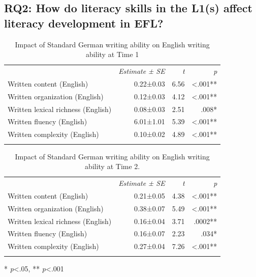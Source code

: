 \documentclass[output=paper,modfonts,nonflat,newtxmath]{langsci/langscibook}
\begin{document}
\subsection{RQ2: {How} {do} {literacy} {skills} {in} {the} {L1(s)} {affect} {literacy} {development} {in} {EFL?}}


\begin{table}
\caption{\label{tab:pfenninger:10}Impact of Standard German writing ability on English writing ability at Time 1}

\begin{tabularx}{0.86\textwidth}{lrrr}
\lsptoprule
& \textit{Estimate} \textit{±} \textit{SE} & \textit{t} & \textit{p}\\
\cmidrule{1-4}
Written content (English) & 0.22±0.03 & 6.56 & <.001**\\
Written organization (English) & 0.12±0.03 & 4.12 & <.001**\\
Written lexical richness (English) & 0.08±0.03 & 2.51 & .008*\\
Written fluency (English) & 6.01±1.01 & 5.39 & <.001**\\
Written complexity (English) & 0.10±0.02 & 4.89 & <.001**\\
\lspbottomrule
\end{tabularx}
\end{table}

\begin{table}
\caption{\label{tab:pfenninger:11}Impact of Standard German writing ability on English writing ability at Time 2.}

\begin{tabularx}{0.86\textwidth}{lrrr}
\lsptoprule
& \textit{Estimate} \textit{±} \textit{SE} & \textit{t} & \textit{p}\\
\cmidrule{1-4}
Written content (English) & 0.21±0.05 & 4.38 & <.001**\\
Written organization (English) & 0.38±0.07 & 5.49 & <.001**\\
Written lexical richness (English) & 0.16±0.04 & 3.71 & .0002**\\
Written fluency (English) & 0.16±0.07 & 2.23 & .034*\\
Written complexity (English) & 0.27±0.04 & 7.26 & <.001**\\
\lspbottomrule
\end{tabularx}

* \textit{p}<.05, ** \textit{p}<.001
\end{table}
\end{document}
